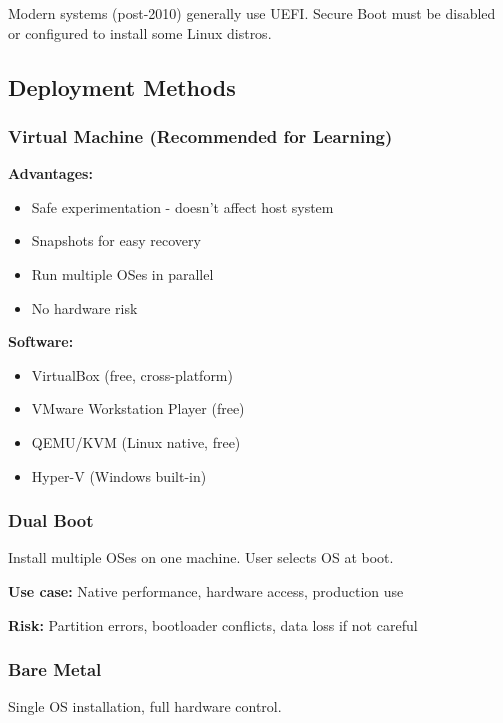 \begin{warningbox}
Modern systems (post-2010) generally use UEFI. Secure Boot must be disabled or configured to install some Linux distros.
\end{warningbox}

\subsection{Deployment Methods}

\subsubsection{Virtual Machine (Recommended for Learning)}

\textbf{Advantages:}
\begin{itemize}
    \item Safe experimentation - doesn't affect host system
    \item Snapshots for easy recovery
    \item Run multiple OSes in parallel
    \item No hardware risk
\end{itemize}

\textbf{Software:}
\begin{itemize}
    \item VirtualBox (free, cross-platform)
    \item VMware Workstation Player (free)
    \item QEMU/KVM (Linux native, free)
    \item Hyper-V (Windows built-in)
\end{itemize}

\subsubsection{Dual Boot}

Install multiple OSes on one machine. User selects OS at boot.

\textbf{Use case:} Native performance, hardware access, production use

\textbf{Risk:} Partition errors, bootloader conflicts, data loss if not careful

\subsubsection{Bare Metal}

Single OS installation, full hardware control.

